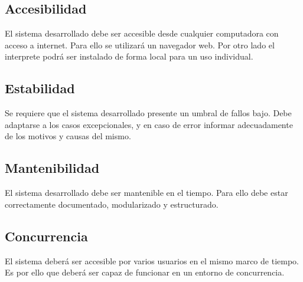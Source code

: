 \subsection{Accesibilidad}
El sistema desarrollado debe ser accesible desde cualquier computadora con acceso a internet. Para ello se utilizará un navegador web. Por otro lado 
el interprete podrá ser instalado de forma local para un uso individual.

\subsection{Estabilidad}
Se requiere que el sistema desarrollado presente un umbral de fallos bajo. Debe adaptarse a los casos excepcionales, y en caso de error informar adecuadamente de
los motivos y causas del mismo.

\subsection{Mantenibilidad}
El sistema desarrollado debe ser mantenible en el tiempo. Para ello debe estar correctamente documentado, modularizado y estructurado. 

\subsection{Concurrencia}
El sistema deberá ser accesible por varios usuarios en el mismo marco de tiempo. Es por ello que deberá ser capaz de funcionar en un entorno de 
concurrencia.



